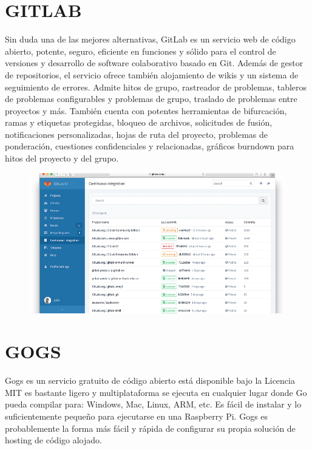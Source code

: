 \documentclass[12pt,letterpaper]{article}
\begin{document}
\section{GITLAB}
Sin duda una de las mejores alternativas, GitLab es un servicio web de código abierto, potente, seguro, eficiente en funciones y sólido para el control de versiones y desarrollo de software colaborativo basado en Git. Además de gestor de repositorios, el servicio ofrece también alojamiento de wikis y un sistema de seguimiento de errores.
Admite hitos de grupo, rastreador de problemas, tableros de problemas configurables y problemas de grupo, traslado de problemas entre proyectos y más.
También cuenta con potentes herramientas de bifurcación, ramas y etiquetas protegidas, bloqueo de archivos, solicitudes de fusión, notificaciones personalizadas, hojas de ruta del proyecto, problemas de ponderación, cuestiones confidenciales y relacionadas, gráficos burndown para hitos del proyecto y del grupo.

\vspace*{-0.025in}
\begin{figure}[htb]
\begin{center}
\includegraphics[width=16cm]{./Imagenes/gitlab}
\end{center}
\end{figure}

\section{GOGS}
Gogs es un servicio gratuito de código abierto está disponible bajo la Licencia MIT es bastante ligero y multiplataforma se ejecuta en cualquier lugar donde Go pueda compilar para: Windows, Mac, Linux, ARM, etc.
Es fácil de instalar y lo suficientemente pequeño para ejecutarse en una Raspberry Pi. Gogs es probablemente la forma más fácil y rápida de configurar su propia solución de hosting de código alojado.
\end{document}
